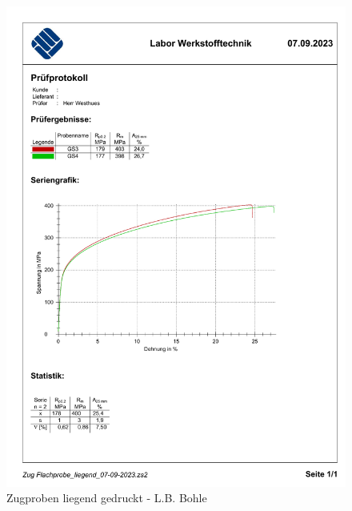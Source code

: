   \begin{figure}[ht]
    \centering
    \includegraphics[width=1\textwidth]{bilder/Zug Flachprobe_liegend_GS.pdf}
    \caption{Zugproben liegend gedruckt - L.B. Bohle}
    \label{ZugprobenGS}
  \end{figure}
  
